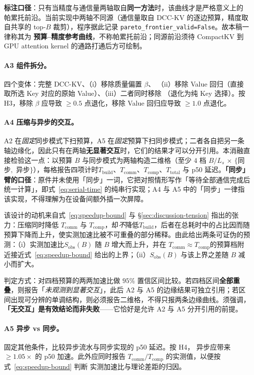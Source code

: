 \textbf{标注口径}：只有当精度与通信量两轴取自\textbf{同一方法}时，该曲线才是严格意义上的
帕累托前沿。当前实现中两轴不同源（通信量取自 DCC-KV 的逐边预算，精度取自共享的
top-$B$ 裁剪），程序据此记录 \texttt{pareto\_frontier\_valid=False}。故本稿一律称其为
\textbf{预算--精度参考曲线}，不称帕累托前沿；同源前沿须待 CompactKV 到 GPU attention
kernel 的通路打通后方可绘制。

\paragraph{A3 组件拆分。}四个变体：完整 DCC-KV、（i）移除质量偏置 $\beta$、
（ii）移除 Value 回归（直接取所选 Key 对应的原始 Value）、（iii）二者同时移除
（退化为纯 Key 选择）。按 H3，移除 $\beta$ 应导致 $\ge 0.5$ 点退化，移除 Value 回归应导致
$\ge 1.0$ 点退化。

\paragraph{A4 压缩与异步的交互。}A2 在\emph{固定}同步模式下扫预算，A5 在\emph{固定}预算下扫同步模式；二者各自把另一条轴边缘化，因此只有在两轴\textbf{无显著交互}时，它们的结果才可以分开引用。本消融直接检验这一点：以预算 $B$ 与同步模式为两轴构造二维格（至少 $4$ 档 $B/L_s$ $\times$ $\{$同步$,$ 异步$\}$），每格报告四项计时$T_{\text{build}}$、$T_{\text{comm}}$、$T_{\text{comp}}$、$T_{\text{total}}$ 与 p50 延迟。\textbf{「同步」臂的口径}：原件并未使用「同步」一词，它把对照情形写作「等待全部通信完成后统一计算」，即式~\eqref{eq:serial-time} 的纯串行实现；A4 与 A5 中的「同步」一律指该实现，不得理解为在设备间额外插一次屏障。

该设计的动机来自式~\eqref{eq:speedup-bound} 与 \S\ref{sec:discussion-tension} 指出的张力：压缩同时降低 $T_{\text{comm}}$ 与 $T_{\text{comp}}$，却\emph{不}降低$T_{\text{build}}$，后者在总耗时中的占比因而随预算下降而上升，使实测加速比被不可重叠的部分稀释。由此给出两条可证伪的预测：（i）实测加速比$S_{\text{obs}}(B)$ 随 $B$ 增大而上升，并在 $T_{\text{comm}} \approx T_{\text{comp}}$的预算档附近接近式~\eqref{eq:speedup-bound} 给出的上界；（ii）$S_{\text{obs}}(B)$ 与该上界之差随 $B$ 减小而扩大。

判定方式：对四档预算的两两加速比做 $95\%$ 置信区间比较。若四档区间\textbf{全部重叠}，则报告「\emph{未观测到显著交互}」，此后 A2 与 A5 的边缘结果可独立引用；若区间出现可分辨的单调结构，则必须报告二维格，不得只报两条边缘曲线。须强调，\textbf{「无交互」是有效结论而非失败}——它恰好是允许 A2 与 A5 分开引用的前提。

\paragraph{A5 异步 vs 同步。}固定其他条件，比较异步流水与同步实现的 p50 延迟。按 H4，
异步应带来 $\ge 1.05\times$ 的 p50 加速。此外应同时报告
$T_{\text{comm}} / T_{\text{comp}}$ 的实测值，以便按式~\eqref{eq:speedup-bound} 判断
实测加速比与理论差距的归因。

